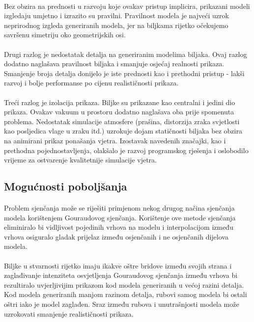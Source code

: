 \documentclass[times, utf8, diplomski]{fer}
\begin{document}
\paragraph{}
Bez obzira na prednosti u razvoju koje ovakav pristup implicira, prikazani 
modeli izgledaju umjetno i izrazito su pravilni. Pravilnost modela je najveći
uzrok neprirodnog izgleda generiranih modela, jer na biljkama rijetko očekujemo
savršenu simetriju oko geometrijskih osi.
\paragraph{}
Drugi razlog je nedostatak detalja na generiranim modelima biljaka. Ovaj razlog 
dodatno naglašava pravilnost biljaka i smanjuje osjećaj realnosti prikaza.
Smanjenje broja detalja donijelo je iste prednosti kao i prethodni pristup - 
lakši razvoj i bolje performanse po cijenu realističnosti prikaza.
\paragraph{}
Treći razlog je izolacija prikaza. Biljke su prikazane kao centralni i jedini 
dio prikaza. Ovakav vakuum u prostoru dodatno naglašava oba prije spomenuta 
problema. Nedostatak simulacije atmosfere (prašina, distorzija zraka svjetlosti 
kao posljedica vlage u zraku itd.) uzrokuje dojam statičnosti biljaka bez
obzira na animirani prikaz ponašanja vjetra. Izostavak navedenih značajki, kao
i prethodna pojednostavljenja, olakšalo je razvoj programskog rješenja i 
oslobodilo vrijeme za ostvarenje kvalitetnije simulacije vjetra.

\subsection{Mogućnosti poboljšanja}
\paragraph{}
Problem sjenčanja može se riješiti primjenom nekog drugog načina sjenčanja 
modela korištenjem Gouraudovog sjenčanja. Korištenje ove metode 
sjenčanja eliminiralo bi vidljivost pojedinih vrhova na modelu i interpolacijom
između vrhova osiguralo gladak prijelaz između osjenčanih i ne osjenčanih 
dijelova modela. 
\paragraph{}
Biljke u stvarnosti rijetko imaju ikakve oštre bridove između svojih strana i 
zaglađivanje intenziteta osvjetljenja Gouraudovog sjenčanja između vrhova bi 
rezultiralo uvjerljivijim prikazom kod modela generiranih u većoj razini 
detalja. Kod modela generiranih manjom razinom detalja, rubovi samog modela bi
ostali oštri iako je model zaglađen. Sraz između rubova i unutrašnjosti modela
može uzrokovati smanjenje realističnosti prikaza.
\end{document}
